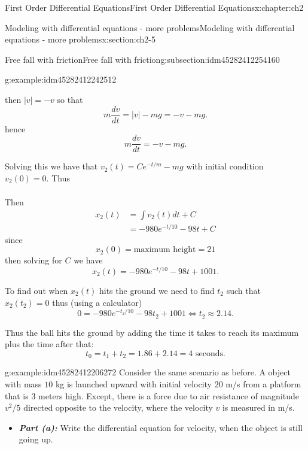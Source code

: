 \documentclass[oneside,10pt,]{book}
\newcommand{\alert}[1]{\textbf{\textit{#1}}}
\numberwithin{equation}{section}
\numberwithin{equation}{section}
\newcommand{\amp}{&}
\begin{document}
\begin{chapterptx}{First Order Differential Equations}{}{First Order Differential Equations}{}{}{x:chapter:ch2}
\begin{sectionptx}{Modeling with differential equations - more problems}{}{Modeling with differential equations - more problems}{}{}{x:section:ch2-5}
\begin{subsectionptx}{Free fall with friction}{}{Free fall with friction}{}{}{g:subsection:idm45282412254160}
\begin{example}{}{g:example:idm45282412242512}
\begin{itemize}[label=\textbullet]
then \(\left|v\right|=-v\) so that%
\begin{equation*}
m\frac{dv}{dt}=\left|v\right|-mg=-v-mg.
\end{equation*}
hence%
\begin{equation*}
m\frac{dv}{dt}=-v-mg.
\end{equation*}
%
\par
Solving this we have that \(v_{2}(t)=Ce^{-t/m}-mg\) with initial condition \(v_{2}(0)=0\). Thus%
\begin{align*}
\end{align*}
%
\par
Then%
\begin{align*}
x_{2}(t) \amp =\int v_{2}(t)dt+C\\
\amp =-980e^{-t/10}-98t+C
\end{align*}
since%
\begin{equation*}
x_{2}(0)=\text{maximum height}=21
\end{equation*}
then solving for \(C\) we have%
\begin{equation*}
x_{2}(t)=-980e^{-t/10}-98t+1001.
\end{equation*}
%
\par
To find out when \(x_{2}(t)\) hits the ground we need to find \(t_{2}\) such that \(x_{2}(t_{2})=0\) thus (using a calculator)%
\begin{equation*}
0=-980e^{-t_{2}/10}-98t_{2}+1001\iff t_{2}\approx2.14.
\end{equation*}
%
\par
Thus the ball hits the ground by adding the time it takes to reach its maximum plus the time after that:%
\begin{equation*}
t_{0}=t_{1}+t_{2}=1.86+2.14=4\text{ seconds}.
\end{equation*}
%
\end{itemize}
\end{example}
\begin{example}{}{g:example:idm45282412206272}%
Consider the same scenario as before. A object with mass \(10\) kg is launched upward with initial velocity \(20\) m\slash{}s from a platform that is \(3\) meters high. Except, there is a force due to air resistance of magnitude \(v^{2}/5\) directed opposite to the velocity, where the velocity \(v\) is measured in m\slash{}s.%
%
\begin{itemize}[label=\textbullet]
\item{}\alert{Part (a):} Write the differential equation for velocity, when the object is still going up.%
\par

\end{itemize}
\end{example}
\end{subsectionptx}
\end{sectionptx}
\end{chapterptx}
\end{document}
